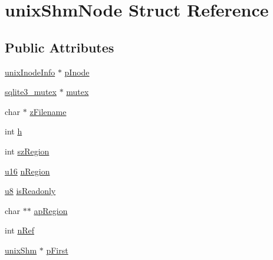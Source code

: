 \hypertarget{structunix_shm_node}{\section{unix\-Shm\-Node Struct Reference}
\label{structunix_shm_node}
}
\subsection*{Public Attributes}
\begin{DoxyCompactItemize}
\item 
\hyperlink{structunix_inode_info}{unix\-Inode\-Info} $\ast$ \hyperlink{structunix_shm_node_ab6bc1cf84d65887a3395da6406843817}{p\-Inode}
\item 
\hyperlink{structsqlite3__mutex}{sqlite3\-\_\-mutex} $\ast$ \hyperlink{structunix_shm_node_aa90850530f48fec6f2a872874f8ddf1f}{mutex}
\item 
char $\ast$ \hyperlink{structunix_shm_node_a188c3bc5fcb4666ad0817ac093e7505d}{z\-Filename}
\item 
int \hyperlink{structunix_shm_node_a9cd93c8052eb47f257e2d752e8f1fdba}{h}
\item 
int \hyperlink{structunix_shm_node_ae8126f9db70a758c2f340ec06869e02b}{sz\-Region}
\item 
\hyperlink{sqlite3_8c_a20f2299e322dcbde37cb07b16910b843}{u16} \hyperlink{structunix_shm_node_aaf1fceb640b3959424403885c0419a46}{n\-Region}
\item 
\hyperlink{sqlite3_8c_a74a0f6424ae628af25f23f0a35f6ead3}{u8} \hyperlink{structunix_shm_node_ad241b0a85f01110310cea91aa38fccb2}{is\-Readonly}
\item 
char $\ast$$\ast$ \hyperlink{structunix_shm_node_a8eff550f9b10a2de463e9874f84efc5e}{ap\-Region}
\item 
int \hyperlink{structunix_shm_node_a6d9f0c9dec3f6710cb09c90723a8284b}{n\-Ref}
\item 
\hyperlink{structunix_shm}{unix\-Shm} $\ast$ \hyperlink{structunix_shm_node_a0ddd6c4625acf5994a60b0c368bc665e}{p\-First}
\end{DoxyCompactItemize}


